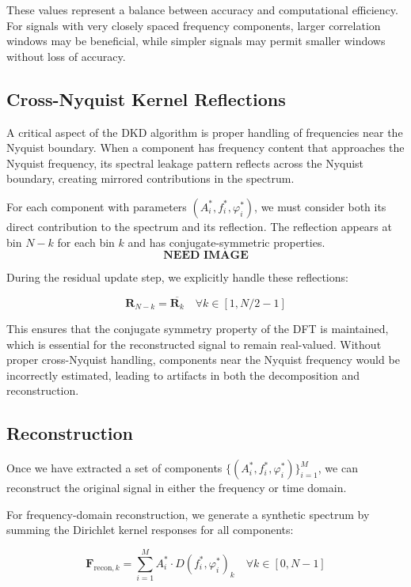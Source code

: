 \documentclass[11pt,twoside]{report}
\numberwithin{thm}{section}
\numberwithin{equation}{section}
\begin{document}
These values represent a balance between accuracy and computational efficiency. For signals with very closely spaced frequency components, larger correlation windows may be beneficial, while simpler signals may permit smaller windows without loss of accuracy.

\subsection{Cross-Nyquist Kernel Reflections}
\label{subsubsec:cross_nyquist_kernel_reflections}

A critical aspect of the DKD algorithm is proper handling of frequencies near the Nyquist boundary. When a component has frequency content that approaches the Nyquist frequency, its spectral leakage pattern reflects across the Nyquist boundary, creating mirrored contributions in the spectrum.

For each component with parameters $(A_i^*, f_i^*, \varphi_i^*)$, we must consider both its direct contribution to the spectrum and its reflection. The reflection appears at bin $N-k$ for each bin $k$ and has conjugate-symmetric properties.
$$\textbf{NEED IMAGE}$$

During the residual update step, we explicitly handle these reflections:

\begin{equation}
\mathbf{R}_{N-k} = \overline{\mathbf{R}_k} \quad \forall k \in [1, N/2-1]
\end{equation}

This ensures that the conjugate symmetry property of the DFT is maintained, which is essential for the reconstructed signal to remain real-valued. Without proper cross-Nyquist handling, components near the Nyquist frequency would be incorrectly estimated, leading to artifacts in both the decomposition and reconstruction.

\subsection{Reconstruction}
\label{subsubsec:reconstruction}

Once we have extracted a set of components $\{(A_i^*, f_i^*, \varphi_i^*)\}_{i=1}^M$, we can reconstruct the original signal in either the frequency or time domain.

For frequency-domain reconstruction, we generate a synthetic spectrum by summing the Dirichlet kernel responses for all components:

\begin{equation}
\mathbf{F}_{\text{recon},k} = \sum_{i=1}^{M} A_i^* \cdot D(f_i^*, \varphi_i^*)_k \quad \forall k \in [0, N-1]
\end{equation}
\end{document}
